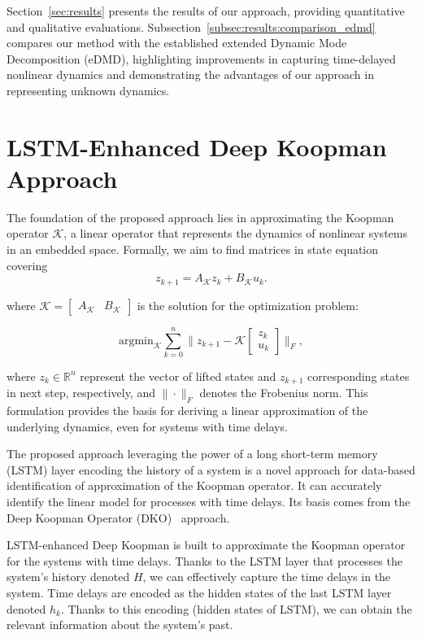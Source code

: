 \documentclass[conference]{IEEEtran}
\begin{document}
Section~\ref{sec:results} presents the results of our approach, providing quantitative and qualitative evaluations. Subsection~\ref{subsec:results:comparison_edmd} compares our method with the established extended Dynamic Mode Decomposition (eDMD), highlighting improvements in capturing time-delayed nonlinear dynamics and demonstrating the advantages of our approach in representing unknown dynamics.


\section{LSTM-Enhanced Deep Koopman Approach}\label{sec:methodology}

The foundation of the proposed approach lies in approximating the Koopman operator \( \mathcal{K} \), a linear operator that represents the dynamics of nonlinear systems in an embedded space.
Formally, we aim to find matrices in state equation covering
\begin{equation}
    z_{k+1} = A_\mathcal{K}z_k + B_\mathcal{K}u_k.
\end{equation}

where \( \mathcal{K} = \begin{bmatrix} A_\mathcal{K} & B_\mathcal{K} \end{bmatrix} \) is the solution for the optimization problem:

\begin{equation}
    \mathrm{argmin}_{\mathcal{K}} \sum_{k=0}^{n} \| z_{k+1} - \mathcal{K} \begin{bmatrix} z_{k} \\ u_k \end{bmatrix} \|_F,
\end{equation}

where \( z_{k} \in \mathbb{R}^n\) represent the vector of lifted states and \( z_{k+1} \) corresponding states in next step, respectively, and \( \|\cdot \| _F\) denotes the Frobenius norm. This formulation provides the basis for deriving a linear approximation of the underlying dynamics, even for systems with time delays.


The proposed approach leveraging the power of a long short-term memory (LSTM) layer encoding the history of a system is a novel approach for data-based identification of approximation of the Koopman operator. It can accurately identify the linear model for processes with time delays. Its basis comes from the Deep Koopman Operator (DKO)~\cite{lusch2018deep} approach.

LSTM-enhanced Deep Koopman is built to approximate the Koopman operator for the systems with time delays. Thanks to the LSTM layer that processes the system's history denoted \(H\), we can effectively capture the time delays in the system. Time delays are encoded as the hidden states of the last LSTM layer denoted \(h_k\). Thanks to this encoding (hidden states of LSTM), we can obtain the relevant information about the system's past.
\end{document}

